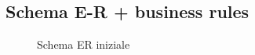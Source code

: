 \documentclass[a4paper]{article}
\begin{document}
\subsection{Schema E-R + business rules}
\begin{center}
\begin{figure}[h]
  \caption{Schema ER iniziale}
  \end{figure}
\end{center}
\end{document}
